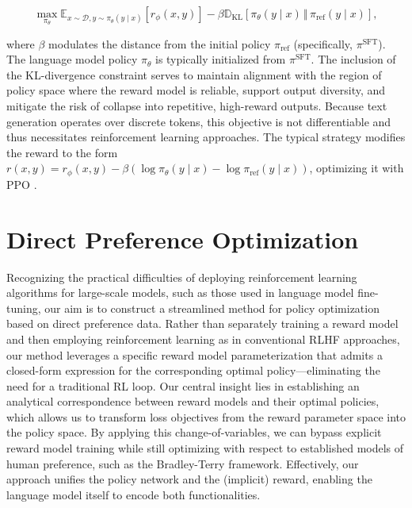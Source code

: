 \begin{equation}\label{eq:RL}
\max_{\pi_{\theta}}  \mathbb{E}_{x\sim \mathcal{D}, y\sim \pi_{\theta}(y \mid x)}\left[r_{\phi}(x, y)\right] - \beta\mathbb{D}_{\textrm{KL}}\left[\pi_{\theta}(y\mid x)\, \Vert\, \pi_\text{ref}(y\mid x)\right],
\end{equation}

where $\beta$ modulates the distance from the initial policy $\pi_\text{ref}$ (specifically, $\pi^\text{SFT}$). The language model policy $\pi_{\theta}$ is typically initialized from $\pi^\text{SFT}$. The inclusion of the KL-divergence constraint serves to maintain alignment with the region of policy space where the reward model is reliable, support output diversity, and mitigate the risk of collapse into repetitive, high-reward outputs. Because text generation operates over discrete tokens, this objective is not differentiable and thus necessitates reinforcement learning approaches. The typical strategy \citep{ziegler2020finetuning, stiennon2022learning, bai2022training, ouyang2022training} modifies the reward to the form ${r(x, y) = r_{\phi}(x, y) -\beta (\log \pi_{\theta}(y\mid x) - \log \pi_\text{ref}(y\mid x))}$, optimizing it with PPO \cite{schulman2017proximal}.

\section{Direct Preference Optimization}\label{sec:DPO}

Recognizing the practical difficulties of deploying reinforcement learning algorithms for large-scale models, such as those used in language model fine-tuning, our aim is to construct a streamlined method for policy optimization based on direct preference data. Rather than separately training a reward model and then employing reinforcement learning as in conventional RLHF approaches, our method leverages a specific reward model parameterization that admits a closed-form expression for the corresponding optimal policy—eliminating the need for a traditional RL loop. Our central insight lies in establishing an analytical correspondence between reward models and their optimal policies, which allows us to transform loss objectives from the reward parameter space into the policy space. By applying this change-of-variables, we can bypass explicit reward model training while still optimizing with respect to established models of human preference, such as the Bradley-Terry framework. Effectively, our approach unifies the policy network and the (implicit) reward, enabling the language model itself to encode both functionalities.

